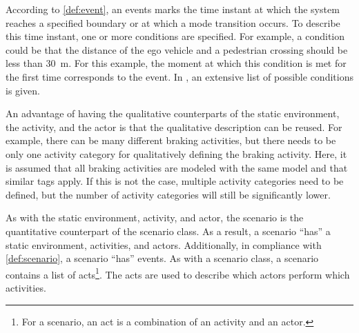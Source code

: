 According to \cref{def:event}, an events marks the time instant at which the system reaches a specified boundary or at which a mode transition occurs. To describe this time instant, one or more conditions are specified. For example, a condition could be that the distance of the ego vehicle and a pedestrian crossing should be less than \SI{30}{\meter}. For this example, the moment at which this condition is met for the first time corresponds to the event. In \cite{openscenario}, an extensive list of possible conditions is given.

An advantage of having the qualitative counterparts of the static environment, the activity, and the actor is that the qualitative description can be reused. For example, there can be many different braking activities, but there needs to be only one activity category for qualitatively defining the braking activity. Here, it is assumed that all braking activities are modeled with the same model and that similar tags apply. If this is not the case, multiple activity categories need to be defined, but the number of activity categories will still be significantly lower.

As with the static environment, activity, and actor, the scenario is the quantitative counterpart of the scenario class. As a result, a scenario ``has'' a static environment, activities, and actors. Additionally, in compliance with \cref{def:scenario}, a scenario ``has'' events. As with a scenario class, a scenario contains a list of acts\cbstart\footnote{\cbstart For a scenario, an act is a combination of an activity and an actor.\cbend}. The acts are used to describe which actors perform which activities.\cbend
